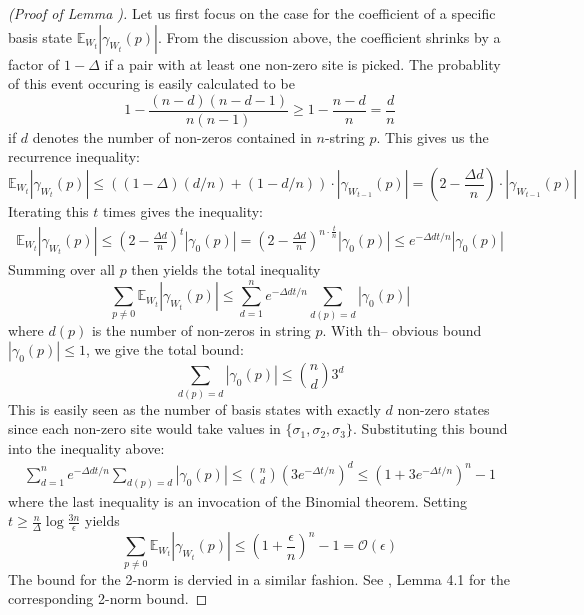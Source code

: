 \documentclass[12pt]{amsart}
\theoremstyle{definition}
\theoremstyle{remark}
\numberwithin{equation}{section}
\theoremstyle{remark}
\begin{document}
\begin{proof}[(Proof of Lemma \label{onedesign})]
  Let us first focus on the case for the coefficient of a specific basis state $\mathbb{E}_{W_t} |\gamma_{W_t}(p)|$. From the discussion above, the coefficient shrinks by a factor of $1 -\Delta$ if a pair with at least one non-zero site is picked. The probablity of this event occuring is easily calculated to be
  $$ 1 - \frac{(n-d)(n-d-1)}{n(n-1)} \geq 1 - \frac{n-d}{n} = \frac{d}{n} $$
  if $d$ denotes the number of non-zeros contained in $n$-string $p$. This gives us the recurrence inequality:
  \begin{equation*}
    \mathbb{E}_{W_t}|\gamma_{W_t}(p)| \leq ((1- \Delta)(d/n) + (1 - d/n))\cdot |\gamma_{W_{t-1}}(p)| = \left(2 - \frac{\Delta d}{n} \right)\cdot |\gamma_{W_{t-1}}(p)|
  \end{equation*}
%
Iterating this $t$ times gives the inequality:
%
\begin{align*}
  \mathbb{E}_{W_t}|\gamma_{W_t}(p)| \leq \left(2 - \frac{\Delta d}{n}\right)^t |\gamma_0(p)| = \left(2 - \frac{\Delta d}{n}\right)^{n \cdot \frac{t}{n}} |\gamma_0(p)| \leq e^{-\Delta d  t/ n} |\gamma_0(p)|
\end{align*}
Summing over all $p$ then yields the total inequality
\begin{equation*}
  \sum_{p \neq 0} \mathbb{E}_{W_t}|\gamma_{W_t}(p)| \leq \sum_{d = 1}^n e^{-\Delta d t/n} \sum_{d(p) = d} |\gamma_0(p)|
\end{equation*}
where $d(p)$ is the number of non-zeros in string $p$. With th-- obvious bound $|\gamma_0(p)| \leq 1$, we give the total bound:
$$ \sum_{d(p) = d} |\gamma_0(p)| \leq {n \choose d} 3^d $$
This is easily seen as the number of basis states with exactly $d$ non-zero states since each non-zero site would take values in $\{\sigma_1, \sigma_2, \sigma_3\}$. Substituting this bound into the inequality above:
\begin{align*}
   \sum_{d = 1}^n e^{-\Delta d t/n} \sum_{d(p) = d} |\gamma_0(p)| \leq {n \choose d} (3e^{-\Delta t/n} )^d \leq (1 + 3e^{-\Delta t/n})^n -1
\end{align*}
where the last inequality is an invocation of the Binomial theorem. Setting $t \geq \frac{n}{\Delta} \log\frac{3n}{\epsilon}$ yields
%
\begin{equation*}
  \sum_{p \neq 0} \mathbb{E}_{W_t}|\gamma_{W_t}(p)| \leq \left(1 + \frac{\epsilon}{n} \right)^n - 1 = \mathcal{O}(\epsilon)
\end{equation*}
%
The bound for the 2-norm is dervied in a similar fashion. See \cite{harrlow}, Lemma 4.1 for the corresponding 2-norm bound.
\end{proof}
\end{document}
